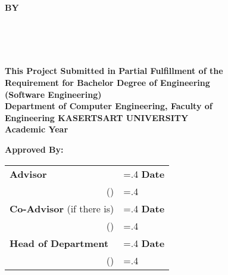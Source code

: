 \thispagestyle{empty}
\begin{center}
    {\huge\textbf{\usevar{\srsTitle}}}\vspace{1in}

    {\huge\textbf{BY}}\vspace{.5in}

    {\huge\textbf{\usevar{\srsAuthorOne} \\
    \usevar{\srsAuthorTwo} \\
    \usevar{\srsAuthorThree} \\
    }}\vfill

    {\large\textbf{This Project Submitted in Partial Fulfillment of the\\
    Requirement for Bachelor Degree of Engineering\\
    (Software Engineering)\\
    Department of Computer Engineering, Faculty of\\
    Engineering KASERTSART UNIVERSITY\\
    Academic Year \usevar{\srsAcademicYear}\\}}
\end{center}

\vspace{.5in}

{\large\textbf{Approved By:}}\vspace{.2in}

\begin{tabularx}{1\textwidth}{X >{\hsize=.4\hsize}X}
    \textbf{Advisor}\dotfill & \textbf{Date}\dotfill \\
    \multicolumn{1}{r}{(\usevar{\srsAdvisorName})} & \\[.1in]

    \textbf{Co-Advisor} (if there is)\dotfill & \textbf{Date}\dotfill \\
    \multicolumn{1}{r}{(\usevar{\srsCoAdvisorName})} & \\[.1in]
    
    \textbf{Head of Department}\dotfill & \textbf{Date}\dotfill \\
    \multicolumn{1}{r}{(\usevar{\srsHoDName})} & \\
\end{tabularx}

\restoregeometry
